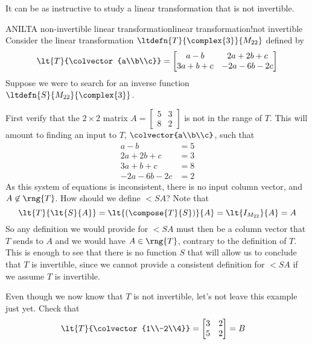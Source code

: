 %
It can be as instructive to study a linear transformation that is not invertible.
%
\begin{example}{ANILT}{A non-invertible linear transformation}{linear transformation!not invertible}
Consider the linear transformation $\ltdefn{T}{\complex{3}}{M_{22}}$ defined by
%
\begin{equation*}
\lt{T}{\colvector{a\\b\\c}}=\begin{bmatrix}
a-b&2a+2b+c\\3a+b+c&-2a-6b-2c
\end{bmatrix}
\end{equation*}
%
Suppose we were to search for an inverse function $\ltdefn{S}{M_{22}}{\complex{3}}$.\par
%
First verify that the $2\times 2$ matrix
$A=\begin{bmatrix}
5&3\\8&2
\end{bmatrix}
$
is not in the range of $T$.  This will amount to finding an input to $T$, $\colvector{a\\b\\c}$, such that
%
\begin{align*}
a-b&=5\\
2a+2b+c&=3\\
3a+b+c&=8\\
-2a-6b-2c&=2
\end{align*}
%
As this system of equations is inconsistent, there is no input column vector, and $A\not\in\rng{T}$.  How should we define $\lt{S}{A}$?  Note that
%
\begin{equation*}
\lt{T}{\lt{S}{A}}=\lt{\left(\compose{T}{S}\right)}{A}=
\lt{I_{M_{22}}}{A}=A
\end{equation*}
%
So any definition we would provide for $\lt{S}{A}$ must then be a column vector that $T$ sends to $A$ and we would have $A\in\rng{T}$, contrary to the definition of $T$.  This is enough to see that there is no function $S$ that will allow us to conclude that $T$ is invertible, since we cannot provide a consistent definition for $\lt{S}{A}$ if we assume $T$ is invertible.\par
%
Even though we now know that $T$ is not invertible, let's not leave this example just yet.  Check that 
%
\begin{align*}
\lt{T}{\colvector{1\\-2\\4}}&=\begin{bmatrix}3&2\\5&2\end{bmatrix}=B&

\end{align*}
\end{example}
